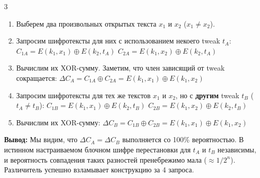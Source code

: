 ﻿\documentclass[9pt,a4paper,landscape]{extarticle}
\newcommand{\tightlist}{}
\begin{document}
\begin{multicols*}{3}
\begin{enumerate}
\def\labelenumi{\arabic{enumi}.}
\tightlist
\item
  Выберем два произвольных открытых текста \(x_1\) и \(x_2\) (\(x_1 \neq x_2\)).
\item
  Запросим шифротексты для них с использованием некоего tweak \(t_A\): \(C_{1A} = E(k_1, x_1) \oplus E(k_2, t_A)\) \(C_{2A} = E(k_1, x_2) \oplus E(k_2, t_A)\)
\item
  Вычислим их XOR-сумму. Заметим, что член зависящий от tweak сокращается: \(\Delta C_A = C_{1A} \oplus C_{2A} = E(k_1, x_1) \oplus E(k_1, x_2)\)
\item
  Запросим шифротексты для тех же текстов \(x_1\) и \(x_2\), но с \textbf{другим} tweak \(t_B\) (\(t_A \neq t_B\)): \(C_{1B} = E(k_1, x_1) \oplus E(k_2, t_B)\) \(C_{2B} = E(k_1, x_2) \oplus E(k_2, t_B)\)
\item
  Вычислим их XOR-сумму: \(\Delta C_B = C_{1B} \oplus C_{2B} = E(k_1, x_1) \oplus E(k_1, x_2)\)
\end{enumerate}

\textbf{Вывод:} Мы видим, что \(\Delta C_A = \Delta C_B\) выполняется со 100\% вероятностью. В истинном настраиваемом блочном шифре перестановки для \(t_A\) и \(t_B\) независимы, и вероятность совпадения таких разностей пренебрежимо мала (\(\approx 1/2^n\)). Различитель успешно взламывает конструкцию за 4 запроса.

\end{multicols*}
\end{document}
